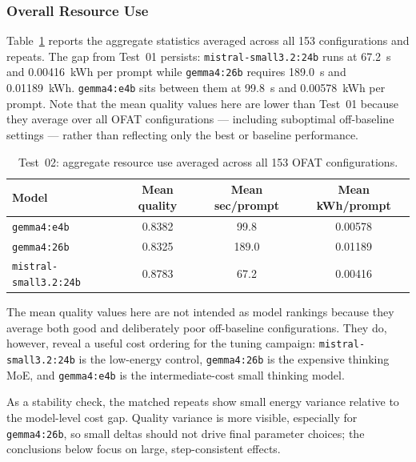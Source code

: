 \subsubsection{Overall Resource Use}

Table~\ref{tab:test02overall} reports the aggregate statistics averaged
across all 153 configurations and repeats. The gap from
Test~01 persists: \texttt{mistral-\allowbreak small3.2:24b} runs at 67.2~s and
0.00416~kWh per prompt while \texttt{gemma4:26b} requires 189.0~s and
0.01189~kWh. \texttt{gemma4:e4b} sits between them at 99.8~s and
0.00578~kWh per prompt.
Note that the mean quality values here are lower than Test~01 because
they average over all OFAT configurations — including suboptimal
off-baseline settings — rather than reflecting only the best or baseline
performance.

\begin{table}[H]
\centering
{}
\begin{tabular}{|l|c|c|c|}
\hline
\rowcolor{bluePoli!30}
\textbf{Model} & \textbf{Mean quality} & \textbf{Mean sec/prompt} & \textbf{Mean kWh/prompt} \T\B \\
\hline
\texttt{gemma4:e4b}           & 0.8382 & \phantom{0}99.8 & 0.00578 \T\B \\
\hline
\texttt{gemma4:26b}           & 0.8325 & 189.0 & 0.01189 \T\B \\
\hline
\texttt{mistral-\allowbreak small3.2:24b} & 0.8783 & \phantom{0}67.2 & 0.00416 \T\B \\
\hline
\end{tabular}
\caption{Test~02: aggregate resource use averaged across all 153 OFAT configurations.}
\label{tab:test02overall}
\end{table}

The mean quality values here are not intended as model rankings because they
average both good and deliberately poor off-baseline configurations. They do,
however, reveal a useful cost ordering for the tuning campaign:
\texttt{mistral-\allowbreak small3.2:24b} is the low-energy control, \texttt{gemma4:26b}
is the expensive thinking MoE, and \texttt{gemma4:e4b} is the intermediate-cost
small thinking model.

As a stability check, the matched repeats show small energy
variance relative to the model-level cost gap. Quality variance is more visible,
especially for \texttt{gemma4:26b}, so small deltas should not drive final
parameter choices; the conclusions below focus on large, step-consistent
effects.

